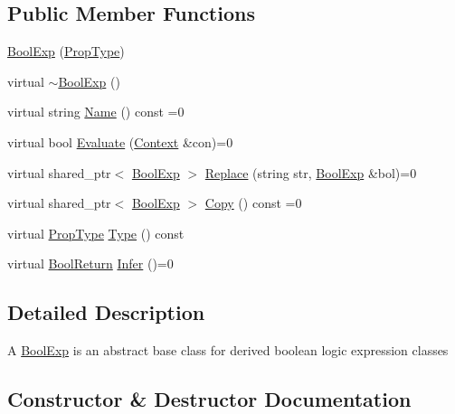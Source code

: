 \subsection*{Public Member Functions}
\begin{DoxyCompactItemize}
\item 
\mbox{\hyperlink{classBoolExp_afe8ce549303b55538b376f0975c2cd25}{Bool\+Exp}} (\mbox{\hyperlink{boolexp_8h_ac6a79184a0a7c1d2e3ea745512aa2d0c}{Prop\+Type}})
\item 
virtual \mbox{\hyperlink{classBoolExp_a3172fb0a33eba2f75c3737173df94066}{$\sim$\+Bool\+Exp}} ()
\item 
virtual string \mbox{\hyperlink{classBoolExp_a3fdb64a9b8fd54e33d755ff4a577d11a}{Name}} () const =0
\item 
virtual bool \mbox{\hyperlink{classBoolExp_a591fb5f9cb849e0f56e596406a9a10d0}{Evaluate}} (\mbox{\hyperlink{classContext}{Context}} \&con)=0
\item 
virtual shared\+\_\+ptr$<$ \mbox{\hyperlink{classBoolExp}{Bool\+Exp}} $>$ \mbox{\hyperlink{classBoolExp_a6448b7121c238759cc9cc8e48d6f8773}{Replace}} (string str, \mbox{\hyperlink{classBoolExp}{Bool\+Exp}} \&bol)=0
\item 
virtual shared\+\_\+ptr$<$ \mbox{\hyperlink{classBoolExp}{Bool\+Exp}} $>$ \mbox{\hyperlink{classBoolExp_a846c30d1730cf645a040978a4cf7cdbb}{Copy}} () const =0
\item 
virtual \mbox{\hyperlink{boolexp_8h_ac6a79184a0a7c1d2e3ea745512aa2d0c}{Prop\+Type}} \mbox{\hyperlink{classBoolExp_a1a6d410fe97a2b1b9452dd87a13b3082}{Type}} () const
\item 
virtual \mbox{\hyperlink{structBoolReturn}{Bool\+Return}} \mbox{\hyperlink{classBoolExp_a0e5d4a241332ae72d083645e4b71e0e6}{Infer}} ()=0
\end{DoxyCompactItemize}


\subsection{Detailed Description}
A \mbox{\hyperlink{classBoolExp}{Bool\+Exp}} is an abstract base class for derived boolean logic expression classes 

\subsection{Constructor \& Destructor Documentation}
\mbox{\label{classBoolExp_afe8ce549303b55538b376f0975c2cd25}} 
